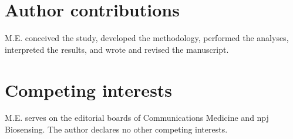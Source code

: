 \documentclass[11pt]{article}
\begin{document}
\section*{Author contributions}
M.E. conceived the study, developed the methodology, performed the analyses, interpreted the results, and wrote and revised the manuscript.
\section*{Competing interests}
M.E. serves on the editorial boards of Communications Medicine and npj Biosensing. The author declares no other competing interests.
\begingroup\scriptsize\setlength{\bibsep}{0pt}\endgroup
\end{document}
